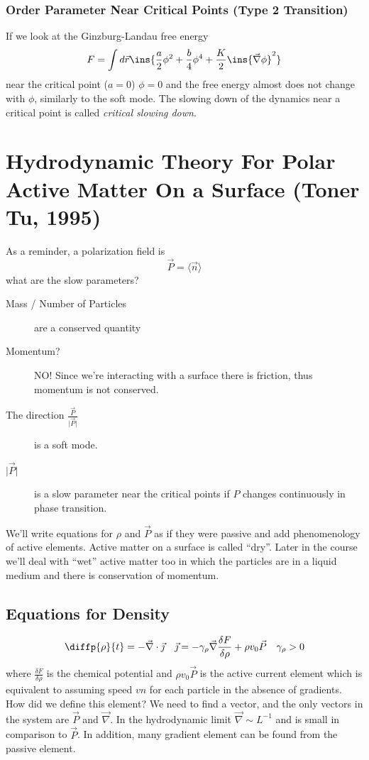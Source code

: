 \subsubsection{Order Parameter Near Critical Points (Type 2 Transition)}
If we look at the Ginzburg-Landau free energy
\begin{equation}
	F = \int d\vec r \ins{\frac{a}{2}\phi^2 + \frac{b}{4}\phi^4+\frac{K}{2}\ins{\vec\nabla \phi}^2}
\end{equation}
near the critical point (\(a=0\)) \(\phi = 0\) and the free energy almost does not change with \(\phi \), similarly to the soft mode. The slowing down of the dynamics near a critical point is called \emph{critical slowing down}.

\section{Hydrodynamic Theory For Polar Active Matter On a Surface (Toner Tu, 1995)}
As a reminder, a polarization field is
\begin{equation}
	\vec P = \langle \vec n \rangle
\end{equation}
what are the slow parameters?
\begin{description}
	\item[Mass / Number of Particles] are a conserved quantity
	\item[Momentum?] NO\@! Since we're interacting with a surface there is friction, thus momentum is not conserved.
	\item[The direction \(\frac{\vec P}{\lvert\vec P\rvert}\)] is a soft mode.
	\item[\(\lvert\vec P\rvert \)] is a slow parameter near the critical points if \(P\) changes continuously in phase transition.
\end{description}
We'll write equations for \(\rho \) and \(\vec P\) as if they were passive and add phenomenology of active elements. Active matter on a surface is called ``dry''. Later in the course we'll deal with ``wet'' active matter too in which the particles are in a liquid medium and there is conservation of momentum.
\subsection{Equations for Density}
\begin{align}
	\diffp{\rho}{t} = -\vec\nabla\cdot\vec{\jmath} && \vec{\jmath} = -\gamma_\rho \vec\nabla \frac{\delta F}{\delta\rho}+\rho v_0\vec P \quad \gamma_\rho > 0
\end{align}
where \(\frac{\delta F}{\delta\rho}\) is the chemical potential and \(\rho v_0\vec P\) is the active current element which is equivalent to assuming speed \(v\hat n\) for each particle in the absence of gradients. How did we define this element? We need to find a vector, and the only vectors in the system are \(\vec P\) and \(\vec\nabla \). In the hydrodynamic limit \(\vec\nabla \sim L^{-1}\) and is small in comparison to \(\vec P\). In addition, many gradient element can be found from the passive element.
